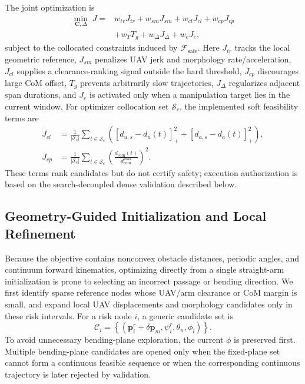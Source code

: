 \documentclass[journal,twoside]{IEEEtran}
\begin{document}
The joint optimization is
\begin{equation}
\begin{aligned}
\min_{\mathbf C,\Delta}\;J={}&w_{tr}J_{tr}+w_{sm}J_{sm}+w_{cl}J_{cl}
+w_{cp}J_{cp}\\
&+w_TT_g+w_\Delta J_\Delta+w_eJ_e,
\end{aligned}
\label{eq:joint_objective}
\end{equation}
subject to the collocated constraints induced by $\mathcal F_{\mathrm{safe}}$. Here $J_{tr}$ tracks the local geometric reference, $J_{sm}$ penalizes UAV jerk and morphology rate/acceleration, $J_{cl}$ supplies a clearance-ranking signal outside the hard threshold, $J_{cp}$ discourages large CoM offset, $T_g$ prevents arbitrarily slow trajectories, $J_\Delta$ regularizes adjacent span durations, and $J_e$ is activated only when a manipulation target lies in the current window. For optimizer collocation set $\mathcal S_c$, the implemented soft feasibility terms are
\begin{equation}
\begin{aligned}
J_{cl}&=\frac{1}{|\mathcal S_c|}\sum_{t\in\mathcal S_c}
\left([d_{u,s}-d_u(t)]_+^2+[d_{a,s}-d_a(t)]_+^2\right),\\
J_{cp}&=\frac{1}{|\mathcal S_c|}\sum_{t\in\mathcal S_c}
\left(\frac{d_{\mathrm{com}}(t)}{d_{\mathrm{com}}^{\max}}\right)^2.
\end{aligned}
\label{eq:soft_terms}
\end{equation}
These terms rank candidates but do not certify safety; execution authorization is based on the search-decoupled dense validation described below.

\subsection{Geometry-Guided Initialization and Local Refinement}
Because the objective contains nonconvex obstacle distances, periodic angles, and continuum forward kinematics, optimizing directly from a single straight-arm initialization is prone to selecting an incorrect passage or bending direction. We first identify sparse reference nodes whose UAV/arm clearance or CoM margin is small, and expand local UAV displacements and morphology candidates only in these risk intervals. For a risk node $i$, a generic candidate set is
\begin{equation}
\mathcal C_i=
\left\{(\mathbf p_i^r+\delta\mathbf p_m,\psi_i^r,\theta_n,\phi_l)\right\}.
\label{eq:candidate_set}
\end{equation}
To avoid unnecessary bending-plane exploration, the current $\phi$ is preserved first. Multiple bending-plane candidates are opened only when the fixed-plane set cannot form a continuous feasible sequence or when the corresponding continuous trajectory is later rejected by validation.
\end{document}
